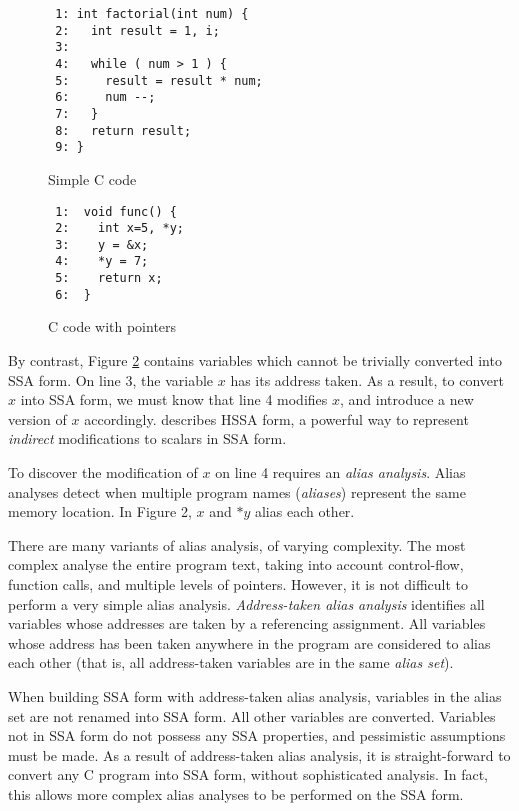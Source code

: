 \begin{figure}[thp]
\begin{verbatim}
 1: int factorial(int num) {
 2:   int result = 1, i;
 3: 
 4:   while ( num > 1 ) {
 5:     result = result * num;
 6:     num --;
 7:   }
 8:   return result;
 9: }
\end{verbatim}
\caption{Simple C code}
\label{c-easy-example}
\end{figure}


\begin{figure}[thp]
\begin{verbatim}
 1:  void func() {
 2:    int x=5, *y;
 3:    y = &x;
 4:    *y = 7;
 5:    return x;
 6:  }
\end{verbatim}
\caption{C code with pointers}
\label{c-hard-example}
\end{figure}




By contrast, Figure \ref{c-hard-example} contains variables which
cannot be trivially converted into SSA form.  On line 3, the variable
$x$ has its address taken.  As a result, to convert $x$ into SSA form,
we must know that line 4 modifies $x$, and introduce a new version of
$x$ accordingly.   describes HSSA form, a powerful way to
represent \textit{indirect} modifications to scalars in SSA form.

To discover the modification of $x$ on line 4 requires an
\textit{alias analysis}.  Alias analyses detect when multiple program
names (\textit{aliases}) represent the same memory location.  In
Figure 2, $x$ and $*y$ alias each other.

There are many variants of alias analysis, of varying complexity.  The
most complex analyse the entire program text, taking into account
control-flow, function calls, and multiple levels of pointers.
However, it is not difficult to perform a very simple alias analysis.
\textit{Address-taken alias analysis} identifies all variables whose
addresses are taken by a referencing assignment.  All variables whose
address has been taken anywhere in the program are considered to alias
each other (that is, all address-taken variables are in the same
\textit{alias set}).

When building SSA form with address-taken alias analysis, variables in
the alias set are not renamed into SSA form.  All other variables are
converted.  Variables not in SSA form do not possess any SSA
properties, and pessimistic assumptions must be made.  As a result of
address-taken alias analysis, it is straight-forward to convert any C
program into SSA form, without sophisticated analysis.  In fact, this
allows more complex alias analyses to be performed on the SSA form.

